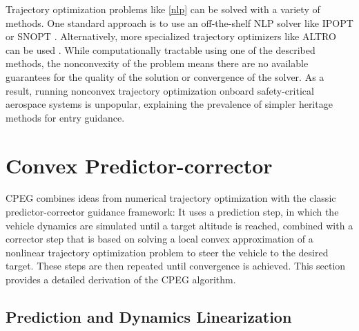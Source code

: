  Trajectory optimization problems like \eqref{nlp} can be solved with a variety of methods. One standard approach is to use an off-the-shelf NLP solver like IPOPT \cite{wachter2006} or SNOPT \cite{gill2005}. Alternatively, more specialized trajectory optimizers like ALTRO can be used \cite{howell2019,jackson2021}.  While computationally tractable using one of the described methods, the nonconvexity of the problem means there are no available guarantees for the quality of the solution or convergence of the solver. As a result, running nonconvex trajectory optimization onboard safety-critical aerospace systems is unpopular, explaining the prevalence of simpler heritage methods for entry guidance. 

 \section{Convex Predictor-corrector}
\label{sec:cpeg1:cpeg}
CPEG combines ideas from numerical trajectory optimization with the classic predictor-corrector guidance framework: It uses a prediction step, in which the vehicle dynamics are simulated until a target altitude is reached, combined with a corrector step that is based on solving a local convex approximation of a nonlinear trajectory optimization problem to steer the vehicle to the desired target. These steps are then repeated until convergence is achieved. This section provides a detailed derivation of the CPEG algorithm.

\subsection{Prediction and Dynamics Linearization}

